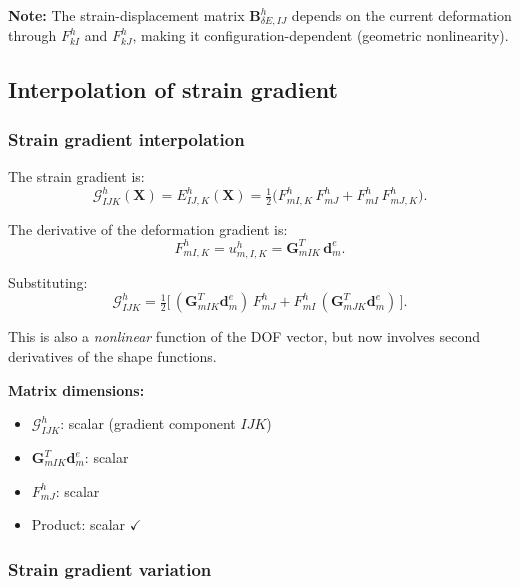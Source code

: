 \documentclass[11pt]{article}
\newcommand{\bX}{\mathbf{X}}
\newcommand{\bX}{\mathbf{X}}
\begin{document}
\textbf{Note:} The strain-displacement matrix $\mathbf{B}_{\delta E,IJ}^{h}$
depends on the current deformation through $F_{kI}^{h}$ and $F_{kJ}^{h}$,
making it configuration-dependent (geometric nonlinearity).

\subsection{Interpolation of strain gradient}
\label{ssec:grad_strain_interp}

\subsubsection{Strain gradient interpolation}

The strain gradient is:
\begin{equation}
\mathcal{G}_{IJK}^{h}(\bX)
= E_{IJ,K}^{h}(\bX)
= \tfrac12\bigl(F_{mI,K}^{h}\,F_{mJ}^{h}
              + F_{mI}^{h}\,F_{mJ,K}^{h}\bigr).
\end{equation}

The derivative of the deformation gradient is:
\begin{equation}
F_{mI,K}^{h} = u_{m,I,K}^{h} = \mathbf{G}_{mIK}^{T}\,\mathbf{d}_{m}^{e}.
\end{equation}

Substituting:
\begin{equation}
\boxed{
\mathcal{G}_{IJK}^{h}
= \tfrac12\bigl[\,
   (\mathbf{G}_{mIK}^{T}\mathbf{d}_{m}^{e})\,F_{mJ}^{h}
 + F_{mI}^{h}\,(\mathbf{G}_{mJK}^{T}\mathbf{d}_{m}^{e})
\,\bigr].
}
\label{s6:G_h}
\end{equation}

This is also a \emph{nonlinear} function of the DOF vector, but now
involves second derivatives of the shape functions.

\textbf{Matrix dimensions:}
\begin{itemize}
\item $\mathcal{G}_{IJK}^{h}$: scalar (gradient component $IJK$)
\item $\mathbf{G}_{mIK}^{T}\mathbf{d}_{m}^{e}$: scalar
\item $F_{mJ}^{h}$: scalar
\item Product: scalar $\checkmark$
\end{itemize}

\subsubsection{Strain gradient variation}
\end{document}
